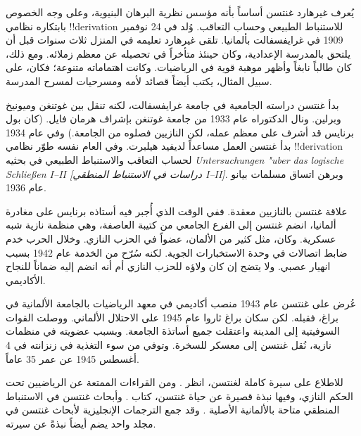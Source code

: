\documentclass[../../../include/open-logic-section]{subfiles}
\begin{document}



يُعرف غيرهارد غنتسن أساساً بأنه مؤسس نظرية البرهان البنيوية، وعلى وجه
الخصوص بابتكاره نظامي !!{derivation} للاستنباط الطبيعي وحساب التعاقب.
وُلد في 24 نوفمبر 1909 في غرايفسفالت بألمانيا. تلقى غيرهارد تعليمه في
المنزل ثلاث سنوات قبل أن يلتحق بالمدرسة الإعدادية، وكان حينئذ متأخراً في
تحصيله عن معظم زملائه. ومع ذلك، كان طالباً نابغاً وأظهر موهبة قوية في
الرياضيات. وكانت اهتماماته متنوعة؛ فكان، على سبيل المثال، يكتب أيضاً
قصائد لأمه ومسرحيات لمسرح المدرسة.

بدأ غنتسن دراسته الجامعية في جامعة غرايفسفالت، لكنه تنقل بين غوتنغن
وميونيخ وبرلين. ونال الدكتوراه عام 1933 من جامعة غوتنغن بإشراف هرمان
فايل. (كان بول برنايس قد أشرف على معظم عمله، لكن النازيين فصلوه من
الجامعة.) وفي عام 1934 بدأ غنتسن العمل مساعداً لديفيد هيلبرت. وفي العام
نفسه طوّر نظامي !!{derivation} لحساب التعاقب والاستنباط الطبيعي في
بحثيه \emph{Untersuchungen "{u}ber das logische Schlie\ss en I--II
  [دراسات في الاستنباط المنطقي I--II]}. وبرهن اتساق مسلمات بيانو عام
1936.

علاقة غنتسن بالنازيين معقدة. ففي الوقت الذي أُجبر فيه أستاذه برنايس على
مغادرة ألمانيا، انضم غنتسن إلى الفرع الجامعي من كتيبة العاصفة، وهي منظمة
نازية شبه عسكرية. وكان، مثل كثير من الألمان، عضواً في الحزب النازي. وخلال
الحرب خدم ضابط اتصالات في وحدة الاستخبارات الجوية. لكنه سُرّح من الخدمة
عام 1942 بسبب انهيار عصبي. ولا يتضح إن كان ولاؤه للحزب النازي أم أنه انضم
إليه ضماناً للنجاح الأكاديمي.

عُرض على غنتسن عام 1943 منصب أكاديمي في معهد الرياضيات بالجامعة الألمانية
في براغ، فقبله. لكن سكان براغ ثاروا عام 1945 على الاحتلال الألماني. ووصلت
القوات السوفيتية إلى المدينة واعتقلت جميع أساتذة الجامعة. وبسبب عضويته في
منظمات نازية، نُقل غنتسن إلى معسكر للسخرة. وتوفي من سوء التغذية في زنزانته
في 4 أغسطس 1945 عن عمر 35 عاماً.

\begin{reading}
للاطلاع على سيرة كاملة لغنتسن، انظر \citet{Menzler-Trott2007}. ومن
القراءات الممتعة عن الرياضيين تحت الحكم النازي، وفيها نبذة قصيرة عن حياة
غنتسن، كتاب \citet{Segal2014}. وأبحاث غنتسن في الاستنباط المنطقي متاحة
بالألمانية الأصلية \citep{Gentzen1935a,Gentzen1935b}. وقد جمع
\citet{Gentzen1969} الترجمات الإنجليزية لأبحاث غنتسن في مجلد واحد يضم
أيضاً نبذةً عن سيرته.
\end{reading}
\end{document}
